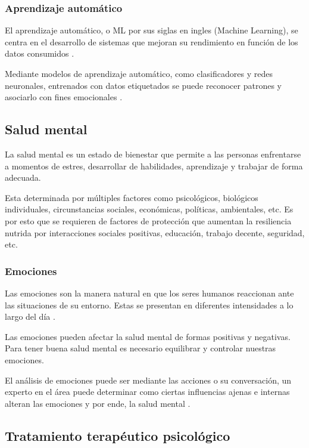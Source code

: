 \documentclass[12pt,twoside]{article}
\begin{document}
	\subsubsection{Aprendizaje automático}
	El aprendizaje automático, o ML por sus siglas en ingles (Machine Learning), se centra en el desarrollo de sistemas que mejoran su rendimiento en función de los datos consumidos \cite{info: ml}. 
	
	Mediante modelos de aprendizaje automático, como clasificadores y redes neuronales, entrenados con datos etiquetados se puede reconocer patrones y asociarlo con fines emocionales \cite{info: pln3}.
	
	\subsection{Salud mental}
	La salud mental es un estado de bienestar que permite a las personas enfrentarse a momentos de estres, desarrollar de habilidades, aprendizaje y trabajar de forma adecuada. 
	
	Esta determinada por múltiples factores como psicológicos, biológicos individuales, circunstancias sociales, económicas, políticas, ambientales, etc. Es por esto que se requieren de factores de protección que aumentan la resiliencia nutrida por interacciones sociales positivas, educación, trabajo decente, seguridad, etc. \cite{info: salud1}
	
	\subsubsection{Emociones}
	Las emociones son la manera natural en que los seres humanos reaccionan ante las situaciones de su entorno. Estas se presentan en diferentes intensidades a lo largo del día \cite{info: salud2}. 
	
	Las emociones pueden afectar la salud mental de formas positivas y negativas. Para tener buena salud mental es necesario equilibrar y controlar nuestras emociones. 
	
	El análisis de emociones puede ser mediante las acciones o su conversación, un experto en el área puede determinar como ciertas influencias ajenas e internas alteran las emociones y por ende, la salud mental \cite{info: salud3}.
	
	\subsection{Tratamiento terapéutico psicológico}
	
\end{document}
